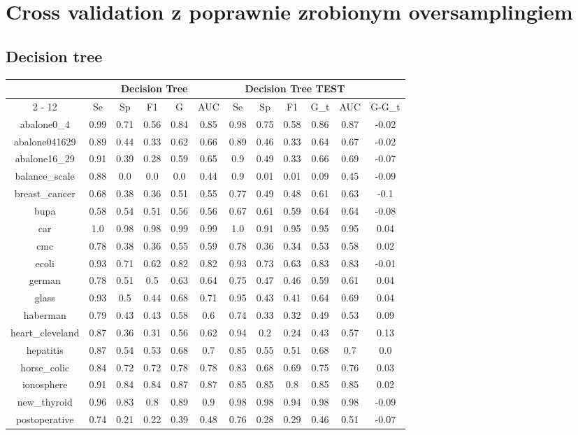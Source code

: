 \documentclass{article}%
\begin{document}
%
\section*{Cross validation z poprawnie zrobionym oversamplingiem}%
\subsection*{Decision tree}%
\begin{tabular}{|c|c|c|c|c|c|c|c|c|c|c|c|}%
\hline%
&\multicolumn{5}{|c|}{Decision Tree}&\multicolumn{5}{|c|}{Decision Tree TEST}&\\%
\cline{2%
-%
12}%
&Se&Sp&F1&G&AUC&Se&Sp&F1&G\_t&AUC&G{-}G\_t\\%
\hline%
abalone0\_4&0.99&0.71&0.56&0.84&0.85&0.98&0.75&0.58&0.86&0.87&{-}0.02\\%
abalone041629&0.89&0.44&0.33&0.62&0.66&0.89&0.46&0.33&0.64&0.67&{-}0.02\\%
abalone16\_29&0.91&0.39&0.28&0.59&0.65&0.9&0.49&0.33&0.66&0.69&{-}0.07\\%
balance\_scale&0.88&0.0&0.0&0.0&0.44&0.9&0.01&0.01&0.09&0.45&{-}0.09\\%
breast\_cancer&0.68&0.38&0.36&0.51&0.55&0.77&0.49&0.48&0.61&0.63&{-}0.1\\%
bupa&0.58&0.54&0.51&0.56&0.56&0.67&0.61&0.59&0.64&0.64&{-}0.08\\%
car&1.0&0.98&0.98&0.99&0.99&1.0&0.91&0.95&0.95&0.95&0.04\\%
cmc&0.78&0.38&0.36&0.55&0.59&0.78&0.36&0.34&0.53&0.58&0.02\\%
ecoli&0.93&0.71&0.62&0.82&0.82&0.93&0.73&0.63&0.83&0.83&{-}0.01\\%
german&0.78&0.51&0.5&0.63&0.64&0.75&0.47&0.46&0.59&0.61&0.04\\%
glass&0.93&0.5&0.44&0.68&0.71&0.95&0.43&0.41&0.64&0.69&0.04\\%
haberman&0.79&0.43&0.43&0.58&0.6&0.74&0.33&0.32&0.49&0.53&0.09\\%
heart\_cleveland&0.87&0.36&0.31&0.56&0.62&0.94&0.2&0.24&0.43&0.57&0.13\\%
hepatitis&0.87&0.54&0.53&0.68&0.7&0.85&0.55&0.51&0.68&0.7&0.0\\%
horse\_colic&0.84&0.72&0.72&0.78&0.78&0.83&0.68&0.69&0.75&0.76&0.03\\%
ionosphere&0.91&0.84&0.84&0.87&0.87&0.85&0.85&0.8&0.85&0.85&0.02\\%
new\_thyroid&0.96&0.83&0.8&0.89&0.9&0.98&0.98&0.94&0.98&0.98&{-}0.09\\%
postoperative&0.74&0.21&0.22&0.39&0.48&0.76&0.28&0.29&0.46&0.51&{-}0.07\\%

\end{tabular}
\end{document}
